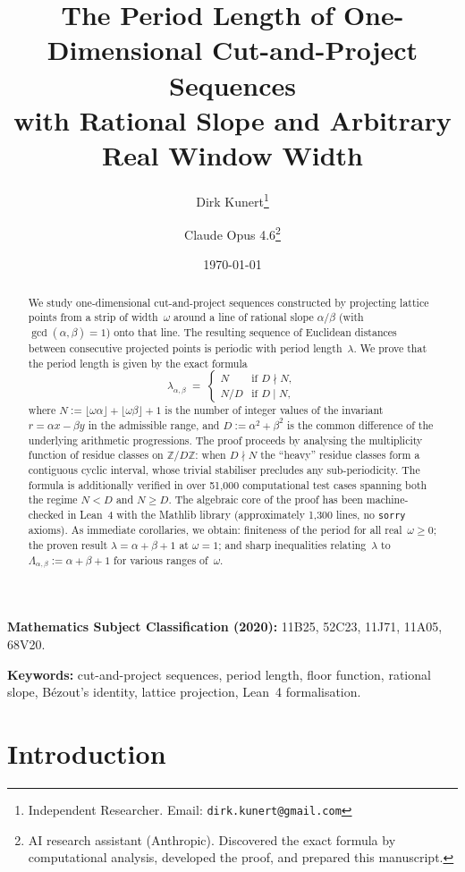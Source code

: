 \documentclass[11pt]{article}
\title{The Period Length of One-Dimensional Cut-and-Project Sequences\\
with Rational Slope and Arbitrary Real Window Width}
\author{
    Dirk Kunert\thanks{Independent Researcher. Email: \texttt{dirk.kunert@gmail.com}}
    \and
    Claude Opus 4.6\thanks{AI research assistant (Anthropic). Discovered the exact
    formula by computational analysis, developed the proof,
    and prepared this manuscript.}
}
\date{\today}
\theoremstyle{plain}
\theoremstyle{definition}
\theoremstyle{remark}
\begin{document}
\maketitle

\begin{abstract}
We study one-dimensional cut-and-project sequences constructed by projecting
lattice points from a strip of width~$\omega$ around a line of rational slope
$\alpha/\beta$ (with $\gcd(\alpha,\beta)=1$) onto that line.
The resulting sequence of Euclidean distances between consecutive projected
points is periodic with period length~$\lambda$.
We prove that the period length is given by the exact formula
\[
    \lambda_{\alpha,\beta} \;=\;
    \begin{cases}
        N & \text{if } D \nmid N, \\[3pt]
        N / D & \text{if } D \mid N,
    \end{cases}
\]
where $N := \lfloor\omega\alpha\rfloor + \lfloor\omega\beta\rfloor + 1$ is
the number of integer values of the invariant $r = \alpha x - \beta y$ in the
admissible range, and $D := \alpha^2 + \beta^2$ is the common difference of
the underlying arithmetic progressions.
The proof proceeds by analysing the multiplicity function of residue
classes on $\mathbb{Z}/D\mathbb{Z}$: when $D \nmid N$ the ``heavy''
residue classes form a contiguous cyclic interval, whose trivial
stabiliser precludes any sub-periodicity.
The formula is additionally verified in over 51{,}000 computational test
cases spanning both the regime $N < D$ and $N \ge D$.
The algebraic core of the proof has been machine-checked in
Lean~4 with the Mathlib library (approximately 1{,}300 lines, no
\texttt{sorry} axioms).
As immediate corollaries, we obtain: finiteness of the period for all
real~$\omega\ge 0$; the proven result $\lambda = \alpha + \beta + 1$ at
$\omega = 1$; and sharp inequalities relating~$\lambda$ to
$\Lambda_{\alpha,\beta} := \alpha + \beta + 1$ for various ranges of~$\omega$.
\end{abstract}

\medskip
\noindent\textbf{Mathematics Subject Classification (2020):}
11B25, 52C23, 11J71, 11A05, 68V20.

\medskip
\noindent\textbf{Keywords:}
cut-and-project sequences, period length, floor function, rational slope,
B\'{e}zout's identity, lattice projection, Lean~4 formalisation.

\section{Introduction}\label{sec:intro}
\end{document}
